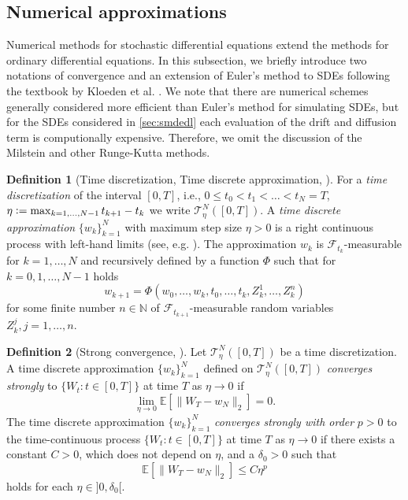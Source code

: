 \documentclass[12pt]{article}
\theoremstyle{definition}
\newtheorem{definition}[definition]{Definition}
\numberwithin{equation}{section}
\newcommand{\N}{\mathbb{N}}
\newcommand{\ev}[1]{\mathbb{E}\left[{#1}\right]}
\newcommand{\norm}[1]{\lVert{#1}\rVert_2}
\newcommand{\defeq}{\vcentcolon=}
\begin{document}
\subsection{Numerical approximations}
\label{subsec:sde_numerical_methods}
Numerical methods for stochastic differential equations extend the methods for ordinary differential equations. In this subsection, we briefly introduce two notations of convergence and an extension of Euler's method to SDEs following the textbook by Kloeden et al. \cite{kloedenNumericalSolutionStochastic2013}. We note that there are numerical schemes generally considered more efficient than Euler's method for simulating SDEs, but for the SDEs considered in \autoref{sec:smdedl} each evaluation of the drift and diffusion term is computionally expensive. Therefore, we omit the discussion of the Milstein and other Runge-Kutta methods.
\begin{definition}[Time discretization, Time discrete approximation, ]
  For a \emph{time discretization} of the interval $[0,T]$, i.e., $0 \leq t_0 < t_1 < \dots < t_N = T$, $\eta \defeq \max_{k=1,\dots,N-1} t_{k+1} - t_k$  we write $\mathcal{T}_\eta^N([0,T])$.
  A \emph{time discrete approximation} $\{w_k\}_{k=1}^N$ with maximum step size $\eta > 0$ is a right continuous process with left-hand limits (see, e.g. \cite[pp.~65]{kloedenNumericalSolutionStochastic2013}). The approximation $w_k$ is $\mathcal{F}_{t_k}$-measurable for $k=1,\dots,N$ and recursively defined by a function $\Phi$ such that for $k=0,1,\dots,N-1$ holds
  \begin{equation}
    w_{k+1} = \Phi(w_0, \dots, w_k, t_0, \dots, t_k, Z^1_k,\dots, Z_k^n)
  \end{equation}
  for some finite number $n \in \N$ of $\mathcal{F}_{t_{k+1}}$-measurable random variables $Z^j_k, j = 1,\dots,n$. 
\end{definition}
\begin{definition}[Strong convergence, ]
  \label{def:strong_convergence}
  Let $\mathcal{T}_\eta^N([0,T])$ be a time discretization. A time discrete approximation $\{w_k\}_{k=1}^N$ defined on $\mathcal{T}_\eta^N([0,T])$ \emph{converges strongly} to $\{W_t:t\in [0,T] \}$ at time $T$ as $\eta \rightarrow 0$ if 
  \begin{equation*}
    \lim_{\eta \rightarrow 0} \ev{\norm{W_{T} - w_N}} = 0.
  \end{equation*}
  The time discrete approximation $\{w_k\}_{k=1}^N$ \emph{converges strongly with order} $p>0$ to the time-continuous process $\{W_t:t\in [0,T] \}$ at time $T$ as $\eta \rightarrow 0$ if there exists a constant $C > 0$, which does not depend on $\eta$, and a $\delta_0 > 0$ such that 
  \begin{equation*}
    \ev{\norm{W_T - w_N}} \leq C \eta^p
  \end{equation*}
  holds for each $\eta \in ]0, \delta_0[$.
\end{definition}
\end{document}
